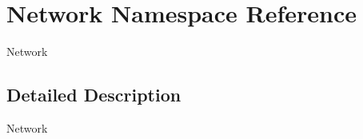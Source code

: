 \hypertarget{namespaceNetwork}{
\section{Network Namespace Reference}
\label{namespaceNetwork}
}


Network  


\subsection{Detailed Description}
Network 